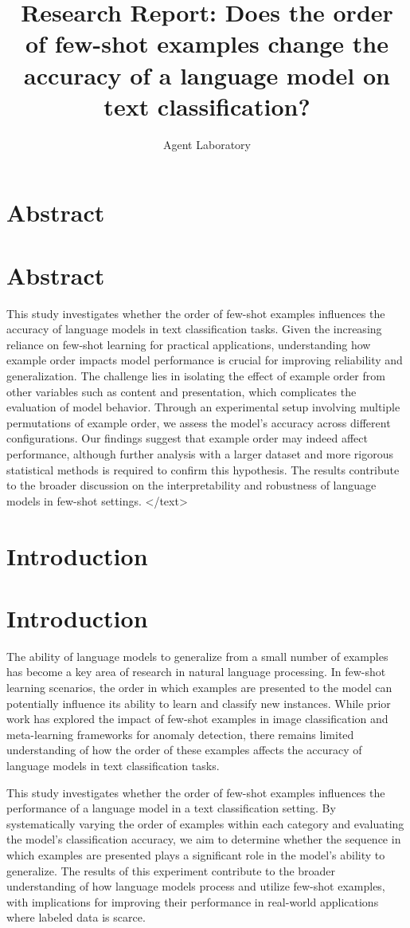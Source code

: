 \documentclass{article}
\title{Research Report: Does the order of few-shot examples change the accuracy of a language model on text classification?}
\author{Agent Laboratory}
\begin{document}
\maketitle
\section{Abstract}
\section*{Abstract}
This study investigates whether the order of few-shot examples influences the accuracy of language models in text classification tasks. Given the increasing reliance on few-shot learning for practical applications, understanding how example order impacts model performance is crucial for improving reliability and generalization. The challenge lies in isolating the effect of example order from other variables such as content and presentation, which complicates the evaluation of model behavior. Through an experimental setup involving multiple permutations of example order, we assess the model's accuracy across different configurations. Our findings suggest that example order may indeed affect performance, although further analysis with a larger dataset and more rigorous statistical methods is required to confirm this hypothesis. The results contribute to the broader discussion on the interpretability and robustness of language models in few-shot settings.
</text>
\section{Introduction}
\section{Introduction}

The ability of language models to generalize from a small number of examples has become a key area of research in natural language processing. In few-shot learning scenarios, the order in which examples are presented to the model can potentially influence its ability to learn and classify new instances. While prior work has explored the impact of few-shot examples in image classification and meta-learning frameworks for anomaly detection, there remains limited understanding of how the order of these examples affects the accuracy of language models in text classification tasks. 

This study investigates whether the order of few-shot examples influences the performance of a language model in a text classification setting. By systematically varying the order of examples within each category and evaluating the model's classification accuracy, we aim to determine whether the sequence in which examples are presented plays a significant role in the model's ability to generalize. The results of this experiment contribute to the broader understanding of how language models process and utilize few-shot examples, with implications for improving their performance in real-world applications where labeled data is scarce.
\end{document}
